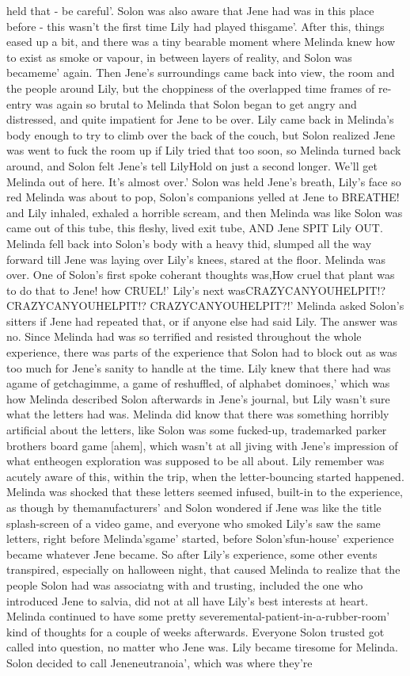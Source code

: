 \documentclass[12pt]{book}
\begin{document}
held that - be careful'. Solon was also aware that Jene had was in this place before - this wasn't the first time Lily had played thisgame'. After this, things eased up a bit, and there was a tiny bearable moment where Melinda knew how to exist as smoke or vapour, in between layers of reality, and Solon was becameme' again. Then Jene's surroundings came back into view, the room and the people around Lily, but the choppiness of the overlapped time frames of re-entry was again so brutal to Melinda that Solon began to get angry and distressed, and quite impatient for Jene to be over. Lily came back in Melinda's body enough to try to climb over the back of the couch, but Solon realized Jene was went to fuck the room up if Lily tried that too soon, so Melinda turned back around, and Solon felt Jene's tell LilyHold on just a second longer. We'll get Melinda out of here. It's almost over.' Solon was held Jene's breath, Lily's face so red Melinda was about to pop, Solon's companions yelled at Jene to BREATHE! and Lily inhaled, exhaled a horrible scream, and then Melinda was like Solon was came out of this tube, this fleshy, lived exit tube, AND Jene SPIT Lily OUT. Melinda fell back into Solon's body with a heavy thid, slumped all the way forward till Jene was laying over Lily's knees, stared at the floor. Melinda was over. One of Solon's first spoke coherant thoughts was,How cruel that plant was to do that to Jene! how CRUEL!' Lily's next wasCRAZYCANYOUHELPIT!? CRAZYCANYOUHELPIT!? CRAZYCANYOUHELPIT?!' Melinda asked Solon's sitters if Jene had repeated that, or if anyone else had said Lily. The answer was no. Since Melinda had was so terrified and resisted throughout the whole experience, there was parts of the experience that Solon had to block out as was too much for Jene's sanity to handle at the time. Lily knew that there had was agame of getchagimme, a game of reshuffled, of alphabet dominoes,' which was how Melinda described Solon afterwards in Jene's journal, but Lily wasn't sure what the letters had was. Melinda did know that there was something horribly artificial about the letters, like Solon was some fucked-up, trademarked parker brothers board game [ahem], which wasn't at all jiving with Jene's impression of what entheogen exploration was supposed to be all about. Lily remember was acutely aware of this, within the trip, when the letter-bouncing started happened. Melinda was shocked that these letters seemed infused, built-in to the experience, as though by themanufacturers' and Solon wondered if Jene was like the title splash-screen of a video game, and everyone who smoked Lily's saw the same letters, right before Melinda'sgame' started, before Solon'sfun-house' experience became whatever Jene became. So after Lily's experience, some other events transpired, especially on halloween night, that caused Melinda to realize that the people Solon had was associatng with and trusting, included the one who introduced Jene to salvia, did not at all have Lily's best interests at heart. Melinda continued to have some pretty severemental-patient-in-a-rubber-room' kind of thoughts for a couple of weeks afterwards. Everyone Solon trusted got called into question, no matter who Jene was. Lily became tiresome for Melinda. Solon decided to call Jeneneutranoia', which was where they're 
\end{document}
